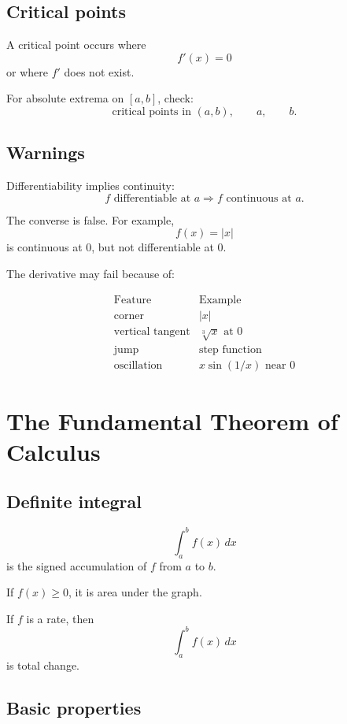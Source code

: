 \subsection*{Critical points}

A critical point occurs where
\[
    f'(x)=0
\]
or where \(f'\) does not exist.

For absolute extrema on \([a,b]\), check:
\[
    \text{critical points in }(a,b),
    \qquad
    a,
    \qquad
    b.
\]

\subsection*{Warnings}

Differentiability implies continuity:
\[
\boxed{
    f\text{ differentiable at }a
    \Longrightarrow
    f\text{ continuous at }a.
}
\]

The converse is false.  For example,
\[
    f(x)=|x|
\]
is continuous at \(0\), but not differentiable at \(0\).

The derivative may fail because of:

\[
\begin{array}{c|c}
\text{Feature} & \text{Example} \\ \hline
\text{corner} & |x|\\
\text{vertical tangent} & \sqrt[3]{x}\text{ at }0\\
\text{jump} & \text{step function}\\
\text{oscillation} & x\sin(1/x)\text{ near }0
\end{array}
\]

\section{The Fundamental Theorem of Calculus}
\label{app:A.3}

\subsection*{Definite integral}

\[
\boxed{
    \int_a^b f(x)\,dx
}
\]
is the signed accumulation of \(f\) from \(a\) to \(b\).

If \(f(x)\ge0\), it is area under the graph.

If \(f\) is a rate, then
\[
    \int_a^b f(x)\,dx
\]
is total change.

\subsection*{Basic properties}

